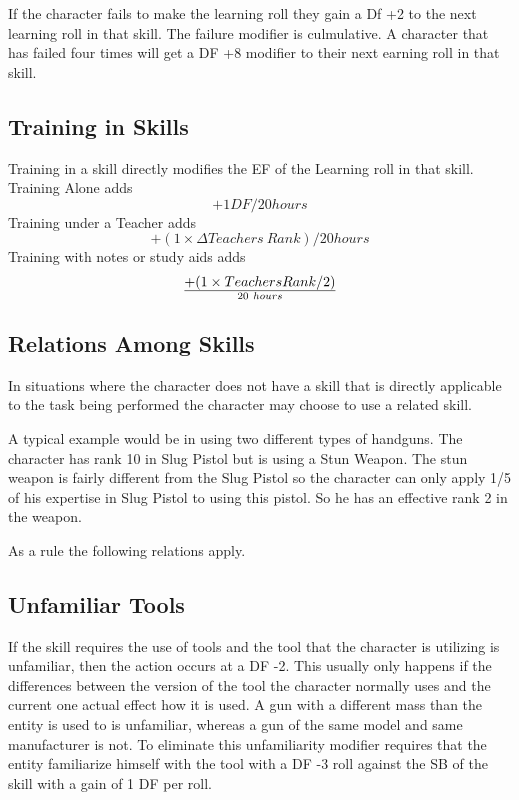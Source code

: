 If the character fails to make the learning roll they gain a Df +2 to the next 
learning roll in that skill. The failure modifier is culmulative. A character
that has failed four times will get a DF +8 modifier to their next earning roll
in that skill.

\subsection{Training in Skills}

Training in a skill directly modifies the EF of the Learning roll in
that skill. Training Alone adds \[+1 DF/20 hours\] 
Training under a Teacher adds \[+(1 \times {\Delta Teachers\ Rank})/20 hours\]
Training with notes or study aids adds \[+(1 \times {Teachers 
Rank}/2) \over {20\ hours}\]

\subsection{Relations Among Skills}

In situations where the character does not have a skill that
is directly applicable to the task being performed the character 
may choose to use a related skill.

A typical example would be in using two different types of handguns. The
character has rank 10 in Slug Pistol but is using a Stun Weapon. The stun
weapon is fairly different from the Slug Pistol so the character can only
apply 1/5 of his expertise in Slug Pistol to using this pistol. So he has
an effective rank 2 in the weapon.

As a rule the following relations apply.



\subsection{Unfamiliar Tools}

If the skill requires the use of tools and the tool that the character is
utilizing is unfamiliar, then the action occurs at a DF -2. This usually
only happens if the differences between the version of the tool the
character normally uses and the current one actual effect how it is
used. A gun with a different mass than the entity is used to is
unfamiliar, whereas a gun of the same model and same manufacturer is
not. To eliminate this unfamiliarity modifier requires that the entity
familiarize himself with the tool with a DF -3 roll against the SB of 
the skill with a gain of 1 DF per roll. 

